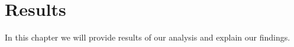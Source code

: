 \chapter{Results}
In this chapter we will provide results of our analysis and explain our findings.
